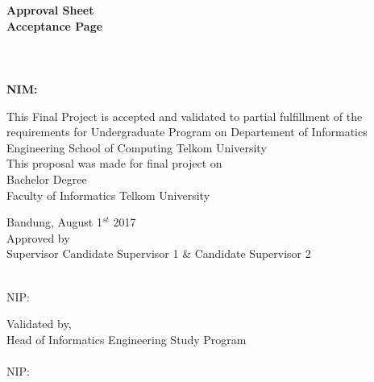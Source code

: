 {\centering
\iflogTA
\textbf{\large Approval Sheet}\\  %
\else
\textbf{\large Acceptance Page}\\
\fi
\vspace{0.5cm}
\textbf{\Title}\\
\vspace{0.5cm}
\textbf{\textit{\EngTitle}}\\
\vspace{0.5cm}
\textbf{\Author}\\
\textbf{NIM: \NIM}\\
\vspace{1cm}

\iflogTA 
{ This Final Project is accepted and validated to partial fulfillment of the requirements for Undergraduate Program on Departement of Informatics Engineering School of Computing Telkom University}\\  %
\else
{ This proposal was made for final project on\\ Bachelor Degree \Prodi\\ Faculty of Informatics Telkom University}\\
\fi
\vspace{0.5cm}

{Bandung, August 1$^{st}$ 2017}\\

\vspace{0.5cm}
{Approved by}\\
\iflogTA
Supervisor
\else
Candidate Supervisor 1 & Candidate Supervisor 2
\fi
\begin{center}
\vspace{2cm}
\underline{\PembimbingSatu} \\ 
NIP: \NIPPembimbingSatu
\end{center}
\vspace{0.5cm}
\iflogTA
Validated by,\\   %
Head of Informatics Engineering Study Program\\ %
\vspace{2.5cm}   %
\underline{\Kaprodi}\\ NIP: \NIPKaprodi\\  %
\fi
}